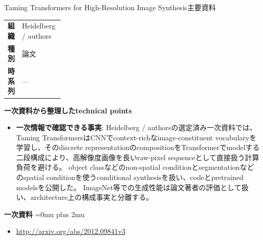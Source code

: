\begin{technicalnote}{Taming Transformers for High-Resolution Image Synthesis}{主要資料}
\begingroup
\begin{tabularx}{\linewidth}{@{}>{\bfseries}p{0.22\linewidth}X@{}}
組織 & Heidelberg / authors \\
種別 & 論文 \\
時系列 & — \\
\end{tabularx}
\smallskip
{\bfseries 一次資料から整理したtechnical points}
\begin{itemize}[leftmargin=1.5em,itemsep=0.35em]
\item \textbf{一次情報で確認できる事実}: Heidelberg / authorsの選定済み一次資料では、Taming TransformersはCNNでcontext-richなimage-constituent vocabularyを学習し、そのdiscrete representationのcompositionをTransformerでmodelする二段構成により、高解像度画像を長いraw-pixel sequenceとして直接扱う計算負荷を避ける。 object classなどのnon-spatial conditionとsegmentationなどのspatial conditionを使うconditional synthesisを扱い、codeとpretrained modelsを公開した。 ImageNet等での生成性能は論文著者の評価として扱い、architecture上の構成事実と分離する。
\end{itemize}
\begin{minipage}{\linewidth}
\begin{samepage}
{\bfseries 一次資料}
\begingroup\sloppy
\Urlmuskip=0mu plus 2mu\relax
\begin{itemize}[leftmargin=1.5em,itemsep=0.25em]
\item {\scriptsize\url{http://arxiv.org/abs/2012.09841v3}}
\end{itemize}
\endgroup
\end{samepage}
\end{minipage}
\endgroup
\end{technicalnote}
\medskip
